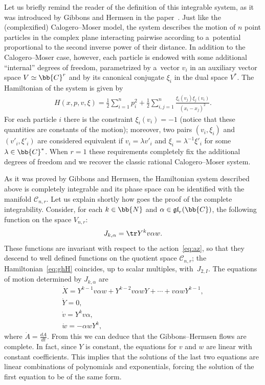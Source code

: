Let us brief\/ly remind the reader of the def\/inition of this integrable system, as it was introduced by
Gibbons and Hermsen in the paper~\cite{gh84}.
Just like the (complexif\/ied) Calogero--Moser model, the system describes the motion of $n$ point
particles in the complex plane interacting pairwise according to a~potential proportional to the second
inverse power of their distance.
In addition to the Calogero--Moser case, however, each particle is endowed with some additional
``internal'' degrees of freedom, parametrized by a~vector \(v_{i}\) in an auxiliary vector space
$V\simeq\bb{C}^r$ and by its canonical conjugate \(\xi_{i}\) in the dual space $V^{\ast}$.
The Hamiltonian of the system is given by
\begin{gather}
\label{eq:ghH}
H(x,p,v,\xi)=\frac{1}{2}\sum_{i=1}^{n}p_{i}^{2}+\frac{1}{2}\sum_{i,j=1}^{n}\frac{\xi_i(v_j)\xi_j(v_i)}
{(x_i-x_j)^{2}}.
\end{gather}
For each particle \(i\) there is the constraint $\xi_{i}(v_{i})=-1$ (notice that these quantities are
constants of the motion); moreover, two pairs \((v_{i},\xi_{i})\) and \((v'_{i},\xi'_{i})\) are considered
equivalent if \(v_{i} = \lambda v'_{i}\) and \(\xi_{i} = \lambda^{-1}\xi'_{i}\) for some \(\lambda\in
\bb{C}^{*}\).
When \(r=1\) these requirements completely f\/ix the additional degrees of freedom and we recover the
classic rational Calogero--Moser system.

As it was proved by Gibbons and Hermsen, the Hamiltonian system described above is completely integrable
and its phase space can be identif\/ied with the manifold \(\mathcal{C}_{n,r}\).
Let us explain shortly how goes the proof of the complete integrability.
Consider, for each \(k\in \bb{N}\) and \(\alpha\in \mathfrak{gl}_{r}(\bb{C})\), the following function on
the space \(V_{n,r}\):
\begin{gather}
\label{eq:fh}
J_{k,\alpha}=\tr Y^{k}v\alpha w.
\end{gather}
These functions are invariant with respect to the action~\eqref{eq:az}, so that they descend to well
def\/ined functions on the quotient space \(\mathcal{C}_{n,r}\); the Hamiltonian~\eqref{eq:ghH} coincides,
up to scalar multiples, with~$J_{2,I}$.
The equations of motion determined by \(J_{k,\alpha}\) are
\begin{gather*}
\dot{X}=Y^{k-1}v\alpha w+Y^{k-2}v\alpha wY+\cdots +v\alpha wY^{k-1},
\\
\dot{Y}=0,
\\
\dot{v}=Y^kv\alpha,
\\
\dot{w}=-\alpha wY^{k},
\end{gather*}
where $\dot{A}=\frac{dA}{dt}$.
From this we can deduce that the Gibbons--Hermsen f\/lows are complete.
In fact, since $Y$ is constant, the equations for $v$ and $w$ are linear with constant coef\/f\/icients.
This implies that the solutions of the last two equations are linear combinations of polynomials and
exponentials, forcing the solution of the f\/irst equation to be of the same form.

